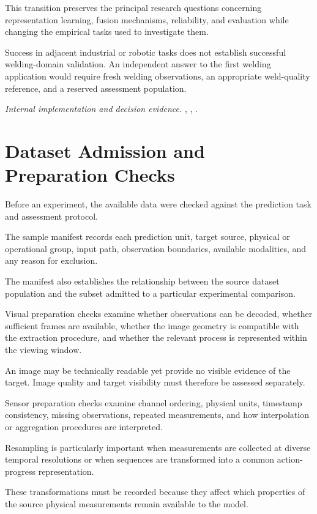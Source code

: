 This transition preserves the principal research questions concerning representation learning, fusion mechanisms, reliability, and evaluation while changing the empirical tasks used to investigate them.

Success in adjacent industrial or robotic tasks does not establish successful welding-domain validation. An independent answer to the first welding application would require fresh welding observations, an appropriate weld-quality reference, and a reserved assessment population.

\noindent\textit{Internal implementation and decision evidence.} , , .

\section{Dataset Admission and Preparation Checks}
\label{sec:ch4-admission}

Before an experiment, the available data were checked against the prediction task and assessment protocol.

The sample manifest records each prediction unit, target source, physical or operational group, input path, observation boundaries, available modalities, and any reason for exclusion.

The manifest also establishes the relationship between the source dataset population and the subset admitted to a particular experimental comparison.

Visual preparation checks examine whether observations can be decoded, whether sufficient frames are available, whether the image geometry is compatible with the extraction procedure, and whether the relevant process is represented within the viewing window.

An image may be technically readable yet provide no visible evidence of the target. Image quality and target visibility must therefore be assessed separately.

Sensor preparation checks examine channel ordering, physical units, timestamp consistency, missing observations, repeated measurements, and how interpolation or aggregation procedures are interpreted.

Resampling is particularly important when measurements are collected at diverse temporal resolutions or when sequences are transformed into a common action-progress representation.

These transformations must be recorded because they affect which properties of the source physical measurements remain available to the model.

